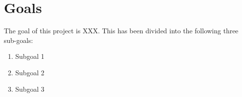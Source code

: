 
\section{Goals}


The goal of this project is XXX. This has been divided into the following three sub-goals:
\begin{enumerate}
\item Subgoal 1 %
\item Subgoal 2%
\item Subgoal 3%
\end{enumerate}


